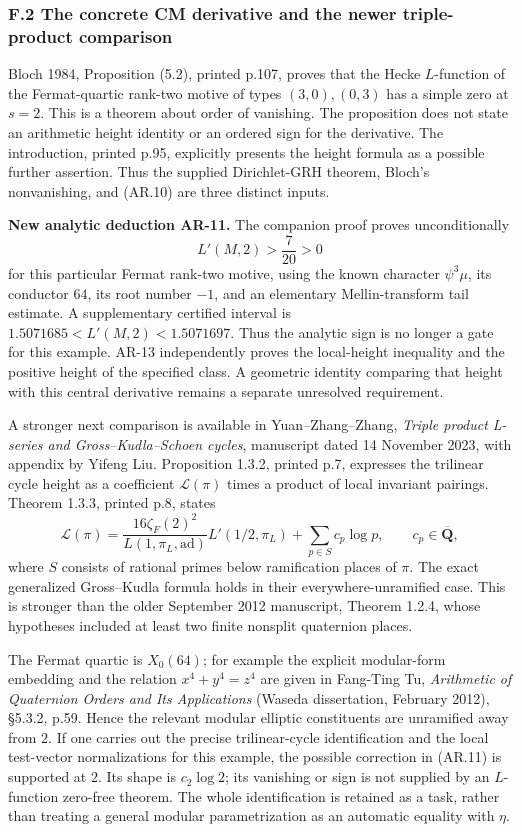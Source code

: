 \documentclass[11pt,a4paper]{article}
\begin{document}
\subsubsection{F.2 The concrete CM derivative and the newer
triple-product
comparison}\label{f.2-the-concrete-cm-derivative-and-the-newer-triple-product-comparison}

Bloch 1984, Proposition (5.2), printed p.107, proves that the Hecke
\(L\)-function of the Fermat-quartic rank-two motive of types
\((3,0),(0,3)\) has a simple zero at \(s=2\). This is a theorem about
order of vanishing. The proposition does not state an arithmetic height
identity or an ordered sign for the derivative. The introduction,
printed p.95, explicitly presents the height formula as a possible
further assertion. Thus the supplied Dirichlet-GRH theorem, Bloch's
nonvanishing, and (AR.10) are three distinct inputs.

\textbf{New analytic deduction AR-11.} The companion proof
 proves unconditionally \[
L'(M,2)>\frac7{20}>0
\] for this particular Fermat rank-two motive, using the known character
\(\psi^3\mu\), its conductor \(64\), its root number \(-1\), and an
elementary Mellin-transform tail estimate. A supplementary certified
interval is \(1.5071685<L'(M,2)<1.5071697\). Thus the analytic sign is
no longer a gate for this example. AR-13 independently proves the
local-height inequality and the positive height of the specified class.
A geometric identity comparing that height with this central derivative
remains a separate unresolved requirement.

A stronger next comparison is available in Yuan--Zhang--Zhang,
\emph{Triple product L-series and Gross--Kudla--Schoen cycles},
manuscript dated 14 November 2023, with appendix by Yifeng Liu.
Proposition 1.3.2, printed p.7, expresses the trilinear cycle height as
a coefficient \(\mathcal L(\pi)\) times a product of local invariant
pairings. Theorem 1.3.3, printed p.8, states \[
\mathcal L(\pi)=
\frac{16\zeta_F(2)^2}{L(1,\pi_L,\mathrm{ad})}
 L'(1/2,\pi_L)+\sum_{p\in S}c_p\log p,
\qquad c_p\in\overline{\mathbf Q},
\tag{AR.11}
\] where \(S\) consists of rational primes below ramification places of
\(\pi\). The exact generalized Gross--Kudla formula holds in their
everywhere-unramified case. This is stronger than the older September
2012 manuscript, Theorem 1.2.4, whose hypotheses included at least two
finite nonsplit quaternion places.

The Fermat quartic is \(X_0(64)\); for example the explicit modular-form
embedding and the relation \(x^4+y^4=z^4\) are given in Fang-Ting Tu,
\emph{Arithmetic of Quaternion Orders and Its Applications} (Waseda
dissertation, February 2012), §5.3.2, p.59. Hence the relevant modular
elliptic constituents are unramified away from \(2\). If one carries out
the precise trilinear-cycle identification and the local test-vector
normalizations for this example, the possible correction in (AR.11) is
supported at \(2\). Its shape is \(c_2\log2\); its vanishing or sign is
not supplied by an \(L\)-function zero-free theorem. The whole
identification is retained as a task, rather than treating a general
modular parametrization as an automatic equality with \(\eta\).
\end{document}
